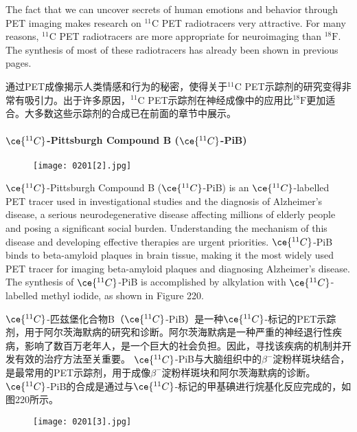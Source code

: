 \documentclass[dvipsnames, svgnames,a4paper,11pt]{article}
\begin{document}
The fact that we can uncover secrets of human emotions and behavior through PET imaging makes research on \(\mathrm{^{11}C}\) PET radiotracers very attractive. For many reasons, \(\mathrm{^{11}C}\) PET radiotracers are more appropriate for neuroimaging than \(\mathrm{^{18}F}\). The synthesis of most of these radiotracers has already been shown in previous pages.

通过PET成像揭示人类情感和行为的秘密，使得关于\(\mathrm{^{11}C}\) PET示踪剂的研究变得非常有吸引力。出于许多原因，\(\mathrm{^{11}C}\) PET示踪剂在神经成像中的应用比\(\mathrm{^{18}F}\)更加适合。大多数这些示踪剂的合成已在前面的章节中展示。

\paragraph{\(\ce{^{11}C}\)-Pittsburgh Compound B (\(\ce{^{11}C}\)-PiB)} 

\begin{wrapfigure}{r}{0.35\textwidth}
    \centering
    \texttt{[image: 0201[2].jpg]}
 \label{fig245}
\end{wrapfigure}

\(\ce{^{11}C}\)-Pittsburgh Compound B (\(\ce{^{11}C}\)-PiB) is an \(\ce{^{11}C}\)-labelled PET tracer used in investigational studies and the diagnosis of Alzheimer's disease, a serious neurodegenerative disease affecting millions of elderly people and posing a significant social burden. Understanding the mechanism of this disease and developing effective therapies are urgent priorities. \(\ce{^{11}C}\)-PiB binds to beta-amyloid plaques in brain tissue, making it the most widely used PET tracer for imaging beta-amyloid plaques and diagnosing Alzheimer's disease. The synthesis of \(\ce{^{11}C}\)-PiB is accomplished by alkylation with \(\ce{^{11}C}\)-labelled methyl iodide, as shown in Figure 220.


\(\ce{^{11}C}\)-匹兹堡化合物B（\(\ce{^{11}C}\)-PiB）是一种\(\ce{^{11}C}\)-标记的PET示踪剂，用于阿尔茨海默病的研究和诊断。阿尔茨海默病是一种严重的神经退行性疾病，影响了数百万老年人，是一个巨大的社会负担。因此，寻找该疾病的机制并开发有效的治疗方法至关重要。 \(\ce{^{11}C}\)-PiB与大脑组织中的$\beta^-$淀粉样斑块结合，是最常用的PET示踪剂，用于成像$\beta^-$淀粉样斑块和阿尔茨海默病的诊断。 \(\ce{^{11}C}\)-PiB的合成是通过与\(\ce{^{11}C}\)-标记的甲基碘进行烷基化反应完成的，如图220所示。

\begin{wrapfigure}{r}{0.35\textwidth}
    \centering
    \texttt{[image: 0201[3].jpg]}
     \label{fig246}
\end{wrapfigure}
\end{document}
